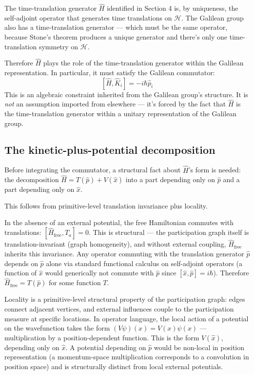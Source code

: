 \documentclass[11pt,a4paper]{article}
\begin{document}
The time-translation generator $\hat{H}$ identified in Section 4 is, by uniqueness, the self-adjoint operator that generates time translations on $\mathcal{H}$. The Galilean group also has a time-translation generator --- which must be the same operator, because Stone's theorem produces a unique generator and there's only one time-translation symmetry on $\mathcal{H}$.

Therefore $\hat{H}$ plays the role of the time-translation generator within the Galilean representation. In particular, it must satisfy the Galilean commutator:
\[
[\hat{H}, \hat{K}_i] = -i\hbar \hat{p}_i
\]
This is an algebraic constraint inherited from the Galilean group's structure. It is \emph{not} an assumption imported from elsewhere --- it's forced by the fact that $\hat{H}$ is the time-translation generator within a unitary representation of the Galilean group.

\subsection{The kinetic-plus-potential decomposition}

Before integrating the commutator, a structural fact about $\hat{H}$'s form is needed: the decomposition $\hat{H} = T(\hat{p}) + V(\hat{x})$ into a part depending only on $\hat{p}$ and a part depending only on $\hat{x}$.

This follows from primitive-level translation invariance plus locality.

In the absence of an external potential, the free Hamiltonian commutes with translations: $[\hat{H}_\mathrm{free}, T_a] = 0$. This is structural --- the participation graph itself is translation-invariant (graph homogeneity), and without external coupling, $\hat{H}_\mathrm{free}$ inherits this invariance. Any operator commuting with the translation generator $\hat{p}$ depends on $\hat{p}$ alone via standard functional calculus on self-adjoint operators (a function of $\hat{x}$ would generically not commute with $\hat{p}$ since $[\hat{x}, \hat{p}] = i\hbar$). Therefore $\hat{H}_\mathrm{free} = T(\hat{p})$ for some function $T$.

Locality is a primitive-level structural property of the participation graph: edges connect adjacent vertices, and external influences couple to the participation measure at specific locations. In operator language, the local action of a potential on the wavefunction takes the form $(V\psi)(x) = V(x)\psi(x)$ --- multiplication by a position-dependent function. This is the form $V(\hat{x})$, depending only on $\hat{x}$. A potential depending on $\hat{p}$ would be non-local in position representation (a momentum-space multiplication corresponds to a convolution in position space) and is structurally distinct from local external potentials.
\end{document}
